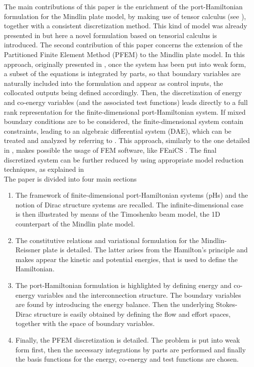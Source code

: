 \documentclass[preprint,12pt]{elsarticle}
\begin{document}
	The main contributions of this paper is the enrichment of the port-Hamiltonian formulation for the Mindlin plate model, by making use of tensor calculus (see \cite[Chapter~16]{Grinfield}), together with a consistent discretization method.  This kind of model was already presented in \cite{MacchelliMindlin} but here a novel formulation based on tensorial calculus is introduced. The second contribution of this paper concerns the extension of the Partitioned Finite Element Method (PFEM) to the Mindlin plate model. In this approach, originally presented in \cite{CardosoRibeiro2018}, once the system has been put into weak form, a subset of the equations is integrated by parts, so that boundary variables are naturally included into the formulation and appear as control inputs, the collocated outputs being defined accordingly. Then, the discretization of energy and co-energy variables (and the associated test functions) leads directly to a full rank representation for the finite-dimensional port-Hamiltonian system. If mixed boundary conditions are to be considered, the finite-dimensional system contain constraints, leading to an algebraic differential system (DAE), which can be treated and analyzed by referring to \cite{vanderSchaft2013, beattie2018linear}. This approach, similarly to the one detailed in \cite{WeakForm_Kot}, makes possible the usage of FEM software, like FEniCS \cite{LoggMardalEtAl2012}. The final discretized system can be further reduced by using appropriate model reduction techniques, as explained in \cite{TONG20132727, Mehrmann2018}  \\
	
	The paper is divided into four main sections 
	\begin{enumerate}
		\item The framework of finite-dimensional port-Hamiltonian systems (pHs) and the notion of Dirac structure systems are recalled. The infinite-dimensional case is then illustrated by means of the Timoshenko beam model, the 1D counterpart of the Mindlin plate model.
		\item The constitutive relations and variational formulation for the Mindlin-Reissner plate is detailed. The latter arises from the Hamilton's principle and makes appear the kinetic and potential energies, that is used to define the Hamiltonian.
		\item The port-Hamiltonian formulation is highlighted by defining energy and co-energy variables and the interconnection structure. The boundary variables are found by introducing the energy balance. Then the underlying Stokes-Dirac structure is easily obtained by defining the flow and effort spaces, together with the space of boundary variables.
		\item Finally, the PFEM discretization is detailed. The problem is put into weak form first, then the necessary integrations by parts are performed and finally the basis functions for the energy, co-energy and test functions are chosen.
	\end{enumerate}
\end{document}
